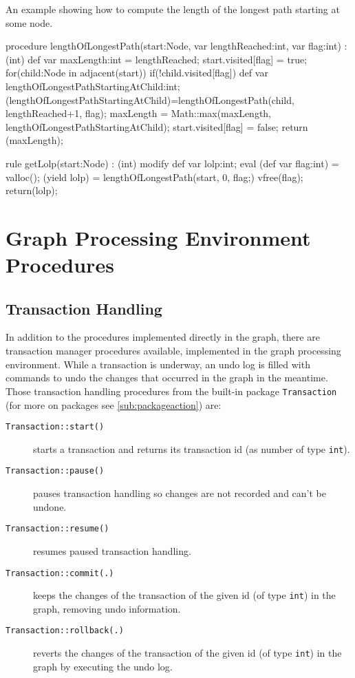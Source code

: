\begin{example}
An example showing how to compute the length of the longest path starting at some node.
\begin{grgen}
procedure lengthOfLongestPath(start:Node, var lengthReached:int, var flag:int) : (int)
{
	def var maxLength:int = lengthReached;
	start.visited[flag] = true;
	for(child:Node in adjacent(start)) {
		if(!child.visited[flag]) {
			def var lengthOfLongestPathStartingAtChild:int;
			(lengthOfLongestPathStartingAtChild)=lengthOfLongestPath(child, lengthReached+1, flag);
			maxLength = Math::max(maxLength, lengthOfLongestPathStartingAtChild);
		}
	}
	start.visited[flag] = false;
	return (maxLength);
}

rule getLolp(start:Node) : (int)
{
	modify {
		def var lolp:int;
		eval {
			(def var flag:int) = valloc();
			(yield lolp) = lengthOfLongestPath(start, 0, flag;)
			vfree(flag);
		}
		return(lolp);
	}
}
\end{grgen}
\end{example}

\section{Graph Processing Environment Procedures}

\subsection{Transaction Handling}\label{sub:transaction}

In addition to the procedures implemented directly in the graph, there are transaction manager procedures available, implemented in the graph processing environment.
While a transaction is underway, an undo log is filled with commands to undo the changes that occurred in the graph in the meantime.
Those transaction handling procedures from the built-in package \texttt{Transaction} (for more on packages see \ref{sub:packageaction}) are:

\begin{description}
\item[\texttt{Transaction::start()}] starts a transaction and returns its transaction id (as number of type \texttt{int}).
\item[\texttt{Transaction::pause()}] pauses transaction handling so changes are not recorded and can't be undone.
\item[\texttt{Transaction::resume()}] resumes paused transaction handling.
\item[\texttt{Transaction::commit(.)}] keeps the changes of the transaction of the given id (of type \texttt{int}) in the graph, removing undo information.
\item[\texttt{Transaction::rollback(.)}] reverts the changes of the transaction of the given id (of type \texttt{int}) in the graph by executing the undo log.
\end{description}

